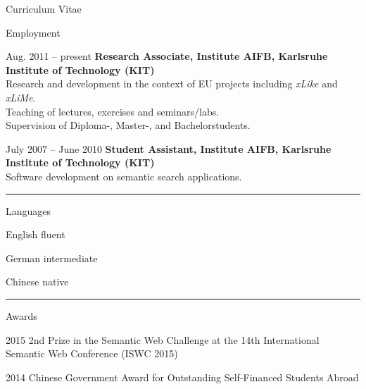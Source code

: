 \begin{cv}{\centerline{\LARGE Curriculum Vitae}}
  \begin{cvlist}{Employment}
  \item[Aug. 2011 -- present]\textbf{Research Associate, Institute AIFB, Karlsruhe Institute of Technology (KIT)}\\
    Research and development in the context of EU projects including 
    \emph{xLike}
    and \emph{xLiMe}.\\
    Teaching of lectures, exercises and seminars/labs.\\
    Supervision of Diploma-, Master-, and Bachelorstudents.
  \item[July 2007 -- June 2010]\textbf{Student Assistant, Institute AIFB, Karlsruhe Institute of Technology (KIT)}\\
    Software development on semantic search applications.
  \end{cvlist}



  \hrule

  \begin{cvlist}{Languages}
  \item[English] fluent
  \item[German] intermediate
  \item[Chinese] native
  \end{cvlist}

  \hrule

  \begin{cvlist}{Awards}
  \item[2015] 2nd Prize in the Semantic Web Challenge at the 14th International Semantic Web Conference (ISWC 2015)
  \item[2014] Chinese Government Award for Outstanding Self-Financed Students Abroad 
  \end{cvlist}


\end{cv}
